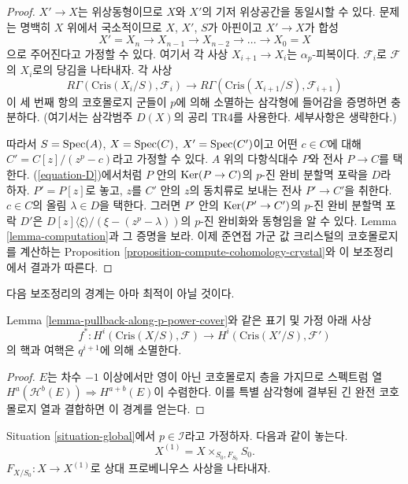 \begin{proof}
$X' \to X$는 위상동형이므로 $X$와 $X'$의 기저 위상공간을 동일시할
수 있다. 문제는 명백히 $X$ 위에서 국소적이므로 $X$, $X'$, $S$가
아핀이고 $X' \to X$가 합성
$$
X' = X_n \to X_{n - 1} \to X_{n - 2} \to \ldots \to X_0 = X
$$
으로 주어진다고 가정할 수 있다. 여기서 각 사상
$X_{i + 1} \to X_i$는 $\alpha_p$-피복이다. $\mathcal{F}_i$로
$\mathcal{F}$의 $X_i$로의 당김을 나타내자. 각 사상
$$
R\Gamma(\text{Cris}(X_i/S), \mathcal{F}_i)
\longrightarrow
R\Gamma(\text{Cris}(X_{i + 1}/S), \mathcal{F}_{i + 1})
$$
이 세 번째 항의 코호몰로지 군들이 $p$에 의해 소멸하는 삼각형에
들어감을 증명하면 충분하다. (여기서는 삼각범주 $D(X)$의 공리 TR4를
사용한다. 세부사항은 생략한다.)

\medskip\noindent
따라서 $S = \mathop{\mathrm{Spec}}(A)$, $X = \mathop{\mathrm{Spec}}(C)$, $X' = \mathop{\mathrm{Spec}}(C')$이고 어떤
$c \in C$에 대해 $C' = C[z]/(z^p - c)$라고 가정할 수 있다. $A$ 위의
다항식대수 $P$와 전사 $P \to C$를 택한다. (\ref{equation-D})에서처럼
$P$ 안의 $\mathop{\mathrm{Ker}}(P \to C)$의 $p$-진 완비 분할멱 포락을 $D$라 하자.
$P' = P[z]$로 놓고, $z$를 $C'$ 안의 $z$의 동치류로 보내는 전사
$P' \to C'$을 취한다. $c \in C$의 올림 $\lambda \in D$을 택한다.
그러면 $P'$ 안의 $\mathop{\mathrm{Ker}}(P' \to C')$의 $p$-진 완비 분할멱 포락 $D'$은
$D[z]\langle \xi \rangle/(\xi - (z^p - \lambda))$의 $p$-진 완비화와
동형임을 알 수 있다. Lemma
\ref{lemma-computation}과 그 증명을 보라. 이제 준연접 가군 값
크리스털의 코호몰로지를 계산하는 Proposition
\ref{proposition-compute-cohomology-crystal}와 이 보조정리에서 결과가
따른다.
\end{proof}

\noindent
다음 보조정리의 경계는 아마 최적이 아닐 것이다.

\begin{lemma}
\label{lemma-pullback-along-p-power-cover-cohomology}
Lemma \ref{lemma-pullback-along-p-power-cover}와 같은 표기 및 가정 아래
사상
$$
f^* :
H^i(\text{Cris}(X/S), \mathcal{F})
\longrightarrow
H^i(\text{Cris}(X'/S), \mathcal{F}')
$$
의 핵과 여핵은 $q^{i + 1}$에 의해 소멸한다.
\end{lemma}

\begin{proof}
$E$는 차수 $-1$ 이상에서만 영이 아닌 코호몰로지 층을 가지므로
스펙트럼 열 $H^a(\mathcal{H}^b(E)) \Rightarrow H^{a + b}(E)$이
수렴한다. 이를 특별 삼각형에 결부된 긴 완전 코호몰로지 열과
결합하면 이 경계를 얻는다.
\end{proof}

\noindent
Situation \ref{situation-global}에서 $p \in \mathcal{I}$라고 가정하자.
다음과 같이 놓는다.
$$
X^{(1)} = X \times_{S_0, F_{S_0}} S_0.
$$
$F_{X/S_0} : X \to X^{(1)}$로 상대 프로베니우스 사상을 나타내자.

